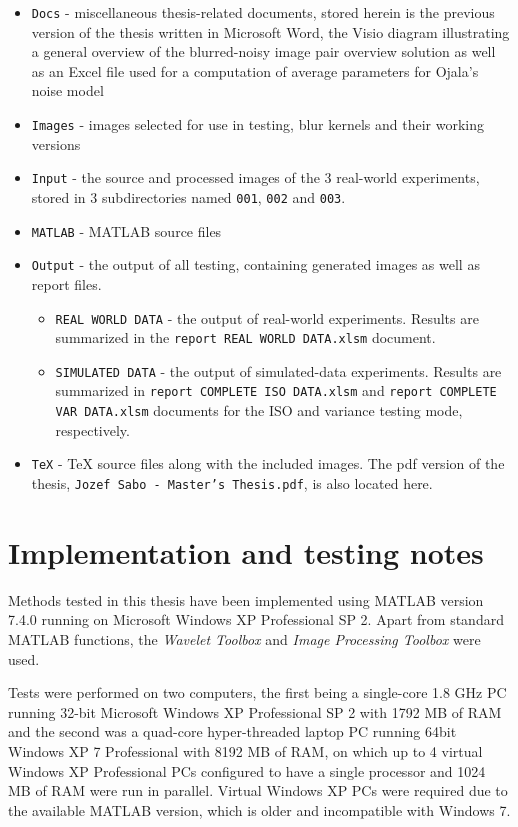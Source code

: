 \documentclass[12pt,notitlepage]{report}
\begin{document}
\begin{itemize}
	\item \texttt{Docs} - miscellaneous thesis-related documents, stored herein is the previous version of the thesis written in Microsoft Word, the Visio diagram illustrating a general overview of the blurred-noisy image pair overview solution as well as an Excel file used for a computation of average parameters for Ojala's noise model
	\item \texttt{Images} - images selected for use in testing, blur kernels and their working versions
	\item \texttt{Input} - the source and processed images of the 3 real-world experiments, stored in 3 subdirectories named \texttt{001}, \texttt{002} and \texttt{003}. 
	\item \texttt{MATLAB} - MATLAB source files
	\item \texttt{Output} - the output of all testing, containing generated images as well as report files. 
	\begin{itemize}
		\item \texttt{REAL WORLD DATA} - the output of real-world experiments. Results are summarized in the \texttt{report REAL WORLD DATA.xlsm} document. 
		\item \texttt{SIMULATED DATA} - the output of simulated-data experiments. Results are summarized in \texttt{report COMPLETE ISO DATA.xlsm} and \texttt{report COMPLETE VAR DATA.xlsm} documents for the ISO and variance testing mode, respectively.
	\end{itemize}
	\item \texttt{TeX} - TeX source files along with the included images. The pdf version of the thesis, \texttt{Jozef Sabo - Master's Thesis.pdf}, is also located here.
\end{itemize} 

\chapter{Implementation and testing notes}
\label{chap:notes}

Methods tested in this thesis have been implemented using MATLAB version 7.4.0 running on Microsoft Windows XP Professional SP 2. Apart from standard MATLAB functions, the {\em Wavelet Toolbox} and {\em Image Processing Toolbox} were used.

Tests were performed on two computers, the first being a single-core 1.8 GHz PC running 32-bit Microsoft Windows XP Professional SP 2 with 1792 MB of RAM and the second was a quad-core hyper-threaded laptop PC running 64bit 
Windows XP 7 Professional with 8192 MB of RAM, on which up to 4 virtual Windows XP Professional PCs configured to have a single processor and 1024 MB of RAM were run in parallel. Virtual Windows XP PCs were required due to the available MATLAB version, which is older and incompatible with Windows 7.
\end{document}
